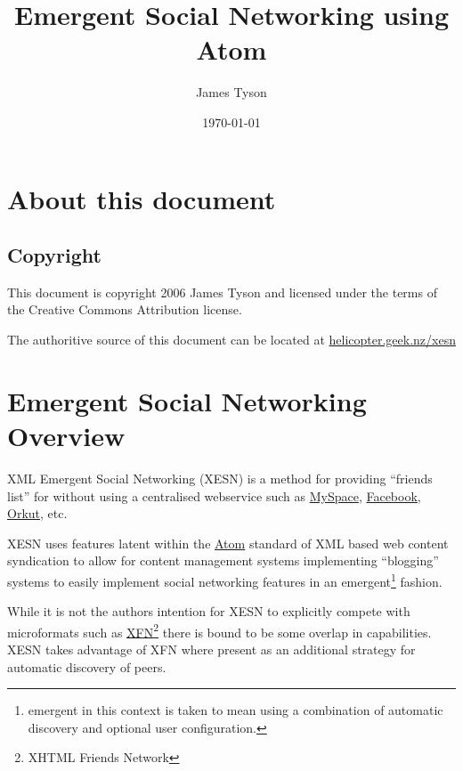 \documentclass[titlepage,english,a4paper,twoside,dvips]{article}
\begin{document}
\sffamily

\title{Emergent Social Networking using Atom}
\author{James Tyson}
\date{\today}

\maketitle

\tableofcontents
\listoffigures
\clearpage

\section{About this document}

\subsection{Copyright}

This document is copyright 2006 James Tyson and licensed under the terms of the Creative Commons Attribution license.

The authoritive source of this document can be located at \href{http://helicopter.geek.nz/xesn}{helicopter.geek.nz/xesn}

\clearpage

\section{Emergent Social Networking Overview}

XML Emergent Social Networking (XESN) is a method for providing ``friends list'' for without using a centralised webservice such as \href{http://www.myspace.com/}{MySpace}, \href{http://www.facebook.com/}{Facebook}, \href{http://www.orkut.com/}{Orkut}, etc.

XESN uses features latent within the \href{http://www.atomenabled.org/}{Atom} standard of XML based web content syndication to allow for content management systems implementing ``blogging'' systems to easily implement social networking features in an emergent\footnote{emergent in this context is taken to mean using a combination of automatic discovery and optional user configuration.} fashion.

While it is not the authors intention for XESN to explicitly compete with microformats such as \href{http://gmpg.org/xfn/}{XFN}\footnote{XHTML Friends Network} there is bound to be some overlap in capabilities.  XESN takes advantage of XFN where present as an additional strategy for automatic discovery of peers.
\end{document}
